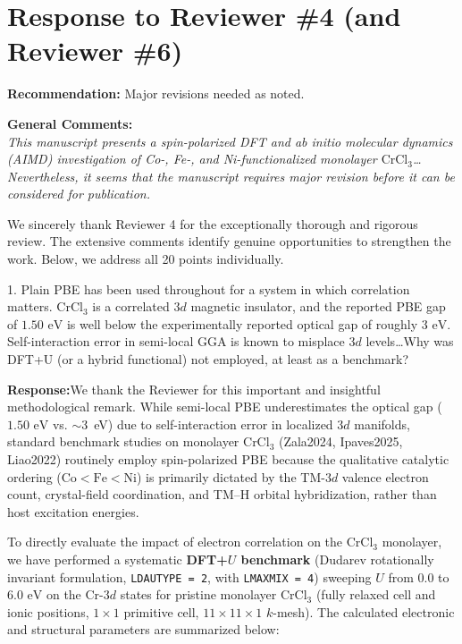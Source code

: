 \documentclass[11pt, sans, a4paper]{moderncv}
\newcommand{\response}{\vspace{0.4em}\noindent\textbf{\color{actionblue}Response:}\hspace{0.5em}}
\begin{document}
\section{Response to Reviewer \#4 (and Reviewer \#6)}

\noindent\textbf{Recommendation:} Major revisions needed as noted.

\vspace{0.5em}
\noindent\textbf{General Comments:}\\
\textit{This manuscript presents a spin-polarized DFT and ab initio molecular dynamics (AIMD) investigation of Co-, Fe-, and Ni-functionalized monolayer $\text{CrCl}_3$\ldots Nevertheless, it seems that the manuscript requires major revision before it can be considered for publication.}

\vspace{0.5em}
\noindent We sincerely thank Reviewer 4 for the exceptionally thorough and rigorous review. The extensive comments identify genuine opportunities to strengthen the work. Below, we address all 20 points individually.

\vspace{1em}

\begin{reviewercomment}
1. Plain PBE has been used throughout for a system in which correlation matters. $\text{CrCl}_3$ is a correlated $3d$ magnetic insulator, and the reported PBE gap of $1.50\text{ eV}$ is well below the experimentally reported optical gap of roughly $3\text{ eV}$. Self-interaction error in semi-local GGA is known to misplace $3d$ levels\ldots Why was DFT+U (or a hybrid functional) not employed, at least as a benchmark?
\end{reviewercomment}

\response We thank the Reviewer for this important and insightful methodological remark. While semi-local PBE underestimates the optical gap ($1.50\text{ eV}$ vs. $\sim$3~eV) due to self-interaction error in localized $3d$ manifolds, standard benchmark studies on monolayer CrCl$_3$ (Zala2024, Ipaves2025, Liao2022) routinely employ spin-polarized PBE because the qualitative catalytic ordering ($\text{Co} < \text{Fe} < \text{Ni}$) is primarily dictated by the TM-$3d$ valence electron count, crystal-field coordination, and TM--H orbital hybridization, rather than host excitation energies.

To directly evaluate the impact of electron correlation on the $\text{CrCl}_3$ monolayer, we have performed a systematic \textbf{DFT+$U$ benchmark} (Dudarev rotationally invariant formulation, \texttt{LDAUTYPE = 2}, with \texttt{LMAXMIX = 4}) sweeping $U$ from $0.0$ to $6.0\text{ eV}$ on the Cr-$3d$ states for pristine monolayer $\text{CrCl}_3$ (fully relaxed cell and ionic positions, $1\times 1$ primitive cell, $11\times 11\times 1$ $k$-mesh). The calculated electronic and structural parameters are summarized below:
\end{document}
